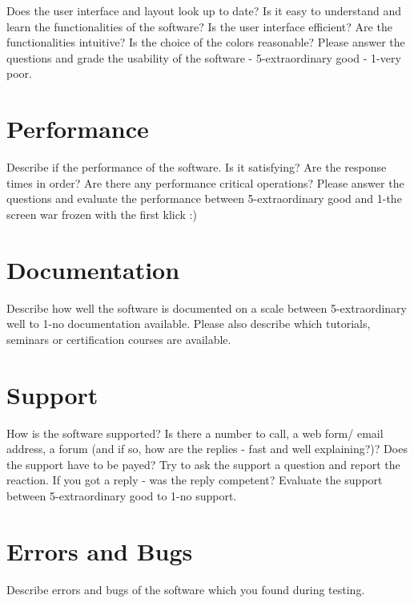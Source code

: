 Does the user interface and layout look up to date? Is it easy to understand and learn the functionalities of the software? Is the user interface efficient? Are the functionalities intuitive? Is the choice of the colors reasonable? Please answer the questions and grade the usability of the software - 5-extraordinary good - 1-very poor.



\section{Performance}

Describe if the performance of the software. Is it satisfying? Are the response times in order? Are there any performance critical operations? Please answer the questions and evaluate the performance between 5-extraordinary good and 1-the screen war frozen with the first klick :)



\section{Documentation}

Describe how well the software is documented on a scale between 5-extraordinary well to 1-no documentation available. Please also describe which tutorials, seminars or certification courses are available. 


\section{Support}

How is the software supported? Is there a number to call, a web form/ email address, a forum (and if so, how are the replies - fast and well explaining?)? Does the support have to be payed? Try to ask the support a question and report the reaction. If you got a reply - was the reply competent? Evaluate the support between 5-extraordinary good to 1-no support.



\section{Errors and Bugs}

Describe errors and bugs of the software which you found during testing.




